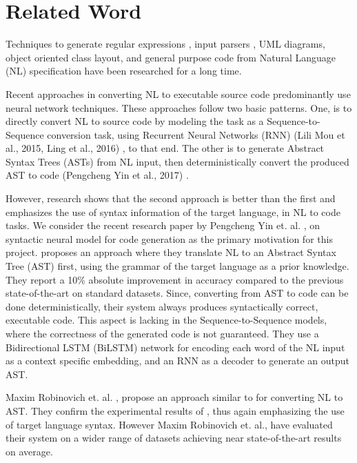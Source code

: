 \documentclass{IEEEtran}
\begin{document}
    \section{Related Word}
    Techniques to generate regular expressions \cite{berant2013semantic}, input parsers
    \cite{lei2013natural}, UML diagrams, object oriented class layout, and general
    purpose code from Natural Language (NL) specification have
    been researched for a long time.

    Recent approaches in converting NL to executable source
    code predominantly use neural network techniques. These approaches follow two basic patterns. 
    One, is to directly convert
    NL to source code by modeling the task as a Sequence-to-Sequence conversion task, 
    using Recurrent Neural Networks
    (RNN) (Lili Mou et al., 2015, Ling et al., 2016) \cite{mou2015end}, 
    \cite{ling2016latent} to that end.
    The other is to generate Abstract Syntax Trees (ASTs) from NL input, then deterministically
    convert the produced AST to code (Pengcheng Yin et al., 2017) \cite{yin2017syntactic}.

    However, research \cite{yin2017syntactic} shows that the second approach is better
    than the first and emphasizes the use of syntax information of
    the target language, in NL to code tasks.
    We consider the recent research paper by Pengcheng Yin
    et. al. \cite{yin2017syntactic} , on syntactic neural model for code generation
    as the primary motivation for this project. \cite{yin2017syntactic} proposes an
    approach where they translate NL to an Abstract Syntax Tree
    (AST) first, using the grammar of the target language
    as a prior knowledge. They report a 10\% absolute improvement in accuracy compared to 
    the previous state-of-the-art
    on standard datasets. Since, converting from AST to code
    can be done deterministically, their system always produces
    syntactically correct, executable code. This aspect is lacking
    in the Sequence-to-Sequence models, where the correctness of
    the generated code is not guaranteed. They use a Bidirectional
    LSTM (BiLSTM) network for encoding each word of the NL input as
    a context specific embedding, and an RNN as a decoder to
    generate an output AST.

    Maxim Robinovich et. al. \cite{rabinovich2017abstract}, propose an approach similar
    to \cite{yin2017syntactic} for converting NL to AST. They confirm the experimental results of \cite{yin2017syntactic}, thus again 
    emphasizing the use of target
    language syntax. However Maxim Robinovich et. al., have
    evaluated their system on a wider range of datasets achieving
    near state-of-the-art results on average.
\end{document}
